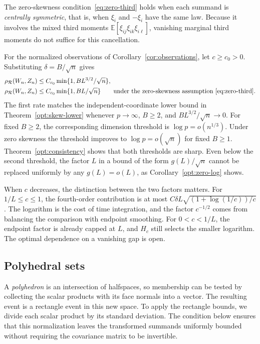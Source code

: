 \documentclass[11pt,letterpaper]{article}
\theoremstyle{remark}
\newcommand{\E}{\mathbb E}
\newcommand{\rh}{\rho_{\mathcal R}}
\begin{document}
The zero-skewness condition~\eqref{eq:zero-third} holds when each summand is \emph{centrally
symmetric}, that is, when \(\xi_i\) and \(-\xi_i\) have the same law. Because it
involves the mixed third moments \(\E[\xi_{ij}\xi_{ik}\xi_{i\ell}]\), vanishing
marginal third moments do not suffice for this cancellation.

For the normalized observations of Corollary~\ref{cor:observations},
let \(c\ge c_0>0\). Substituting \(\delta=B/\sqrt n\) gives
\begin{align}
 \rh(W_n,Z_n)&\le C_{c_0}\min\{1,BL^{3/2}/\sqrt n\},
 \label{eq:observations-fixed}\\
 \rh(W_n,Z_n)&\le C_{c_0}\min\{1,BL/\sqrt n\}
 \qquad\text{under the zero-skewness assumption~\eqref{eq:zero-third}}.
 \label{eq:zero-fixed}
\end{align}
The first rate matches the independent-coordinate lower bound in
Theorem~\ref{opt:skew-lower} whenever \(p\to\infty\), \(B\ge2\),
and \(BL^{3/2}/\sqrt n\to0\). For fixed \(B\ge2\), the corresponding
dimension threshold is \(\log p=o(n^{1/3})\). Under zero skewness the
threshold improves to \(\log p=o(\sqrt n)\) for fixed \(B\ge1\).
Theorem~\ref{opt:consistency} shows that both thresholds are sharp.
Even below the second threshold, the factor \(L\) in a bound of the
form \(g(L)/\sqrt n\) cannot be replaced uniformly by any
\(g(L)=o(L)\), as Corollary~\ref{opt:zero-log} shows.

When \(c\) decreases, the distinction between the two factors matters.
For \(1/L\le c\le1\), the fourth-order contribution is at most
\(C\delta L\sqrt{(1+\log(1/c))/c}\). The logarithm is the cost
of time integration, and the factor \(c^{-1/2}\) comes from balancing
the comparison with endpoint smoothing. For \(0<c<1/L\), the endpoint
factor is already capped at \(L\), and \(H_c\) still selects the
smaller logarithm. The optimal dependence on a vanishing gap is open.

\subsection{Polyhedral sets}\label{sec:polyhedra}
A \emph{polyhedron} is an intersection of halfspaces, so membership can be
tested by collecting the scalar products with its face normals into
a vector. The resulting event is a rectangle event in this new space.
To apply the rectangle bounds, we divide each scalar product by its
standard deviation. The condition below ensures that this normalization
leaves the transformed summands uniformly bounded without requiring
the covariance matrix to be invertible.
\end{document}
